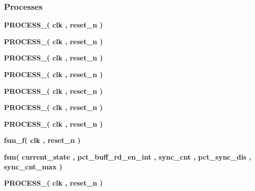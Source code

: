 \subsubsection*{Processes}
 \begin{DoxyCompactItemize}
\item 
{\bf P\+R\+O\+C\+E\+S\+S\+\_}{\bfseries  ( {\bfseries {\bfseries {\bf clk}} \textcolor{vhdlchar}{ }} , {\bfseries {\bfseries {\bf reset\+\_\+n}} \textcolor{vhdlchar}{ }} )}
\item 
{\bf P\+R\+O\+C\+E\+S\+S\+\_}{\bfseries  ( {\bfseries {\bfseries {\bf clk}} \textcolor{vhdlchar}{ }} , {\bfseries {\bfseries {\bf reset\+\_\+n}} \textcolor{vhdlchar}{ }} )}
\item 
{\bf P\+R\+O\+C\+E\+S\+S\+\_}{\bfseries  ( {\bfseries {\bfseries {\bf clk}} \textcolor{vhdlchar}{ }} , {\bfseries {\bfseries {\bf reset\+\_\+n}} \textcolor{vhdlchar}{ }} )}
\item 
{\bf P\+R\+O\+C\+E\+S\+S\+\_}{\bfseries  ( {\bfseries {\bfseries {\bf clk}} \textcolor{vhdlchar}{ }} , {\bfseries {\bfseries {\bf reset\+\_\+n}} \textcolor{vhdlchar}{ }} )}
\item 
{\bf P\+R\+O\+C\+E\+S\+S\+\_}{\bfseries  ( {\bfseries {\bfseries {\bf clk}} \textcolor{vhdlchar}{ }} , {\bfseries {\bfseries {\bf reset\+\_\+n}} \textcolor{vhdlchar}{ }} )}
\item 
{\bf P\+R\+O\+C\+E\+S\+S\+\_}{\bfseries  ( {\bfseries {\bfseries {\bf clk}} \textcolor{vhdlchar}{ }} , {\bfseries {\bfseries {\bf reset\+\_\+n}} \textcolor{vhdlchar}{ }} )}
\item 
{\bf P\+R\+O\+C\+E\+S\+S\+\_}{\bfseries  ( {\bfseries {\bfseries {\bf clk}} \textcolor{vhdlchar}{ }} , {\bfseries {\bfseries {\bf reset\+\_\+n}} \textcolor{vhdlchar}{ }} )}
\item 
{\bf fsm\+\_\+f}{\bfseries  ( {\bfseries {\bfseries {\bf clk}} \textcolor{vhdlchar}{ }} , {\bfseries {\bfseries {\bf reset\+\_\+n}} \textcolor{vhdlchar}{ }} )}
\item 
{\bf fsm}{\bfseries  ( {\bfseries {\bfseries {\bf current\+\_\+state}} \textcolor{vhdlchar}{ }} , {\bfseries {\bfseries {\bf pct\+\_\+buff\+\_\+rd\+\_\+en\+\_\+int}} \textcolor{vhdlchar}{ }} , {\bfseries {\bfseries {\bf sync\+\_\+cnt}} \textcolor{vhdlchar}{ }} , {\bfseries {\bfseries {\bf pct\+\_\+sync\+\_\+dis}} \textcolor{vhdlchar}{ }} , {\bfseries {\bfseries {\bf sync\+\_\+cnt\+\_\+max}} \textcolor{vhdlchar}{ }} )}
\item 
{\bf P\+R\+O\+C\+E\+S\+S\+\_}{\bfseries  ( {\bfseries {\bfseries {\bf clk}} \textcolor{vhdlchar}{ }} , {\bfseries {\bfseries {\bf reset\+\_\+n}} \textcolor{vhdlchar}{ }} )}
\end{DoxyCompactItemize}
